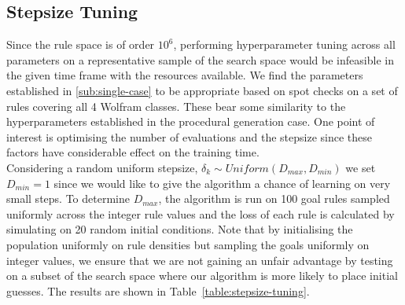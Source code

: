 \subsection{Stepsize Tuning}\label{sub:stepsize-tuning}
 
Since the rule space is of order $10^6$, performing hyperparameter tuning across all parameters on a representative sample of the search space would be infeasible in the given time frame with the resources available. We find the parameters established in \ref{sub:single-case} to be appropriate based on spot checks on a set of rules covering all 4 Wolfram classes. These bear some similarity to the hyperparameters established in the procedural generation case. One point of interest is optimising the number of evaluations and the stepsize since these factors have considerable effect on the training time.\\

Considering a random uniform stepsize, $\delta_k \sim \mathit{Uniform}(D_{max}, D_{min})$ we set $D_{min} = 1$ since we would like to give the algorithm a chance of learning on very small steps. To determine $D_{max}$, the algorithm is run on 100 goal rules sampled uniformly across the integer rule values and the loss of each rule is calculated by simulating on 20 random initial conditions. Note that by initialising the population uniformly on rule densities but sampling the goals uniformly on integer values, we ensure that we are not gaining an unfair advantage by testing on a subset of the search space where our algorithm is more likely to place initial guesses. The results are shown in Table~\ref{table:stepsize-tuning}.

\begin{table}[h!]
    \centering
    \hfill
    \hfill
    \hfill
    \hfill
\caption{Results of learning life-like CA.}
\label{table:stepsize-tuning}
\end{table}

